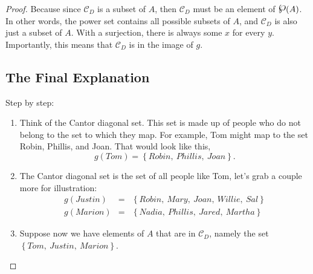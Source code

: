 \begin{proof}
\ifKey\hfill\begin{minipage}{0.5\textwidth}\color{red} Because since $\mathcal{C}_D$ is a subset of $A$, then $\mathcal{C}_D$ must be an element of $\powerset (A)$. In other words, the power set contains all possible subsets of $A$, and $\mathcal{C}_D$ is also just a subset of $A$.  With a surjection, there is always some $x$ for every $y$. Importantly, this means that $\mathcal{C}_D$ is in the image of $g$.\color{black}\end{minipage}
\fi
%
%
%
%
%

\newpage
\subsection*{The Final Explanation}
Step by step:
\begin{enumerate}
\item Think of the Cantor diagonal set.  This set is made up of people who do not belong to the set to which they map.  For example, Tom might map to the set Robin, Phillis, and Joan.  That would look like this,
$$g(Tom) = \left\{ Robin, ~ Phillis, ~ Joan \right\}.$$
\item The Cantor diagonal set is the set of all people like Tom,  let's grab a couple more for illustration:
\begin{eqnarray*}
g(Justin) &=& \left\{ Robin, ~ Mary, ~ Joan, ~ Willie, ~Sal\right\}\\
g(Marion) &=& \left\{ Nadia, ~ Phillis, ~ Jared, ~Martha \right\}
\end{eqnarray*}
\item Suppose now we have elements of $A$ that are in $\mathcal{C}_D$, namely the set $ \left\{ Tom, ~ Justin, ~ Marion \right\}$.  


\end{enumerate}
\end{proof}
